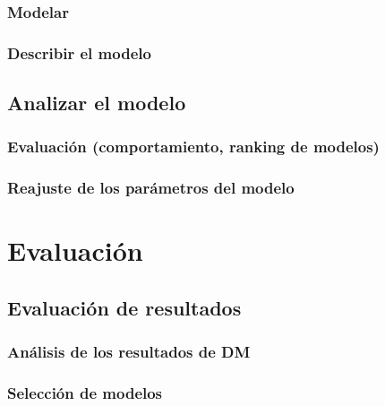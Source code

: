 \documentclass[11pt,a4paper,twoside]{tesis}
\begin{document}
\subsection{Modelar}
\subsection{Describir el modelo}
\section{Analizar el modelo}
\subsection{Evaluación (comportamiento, ranking de modelos)}
\subsection{Reajuste de los parámetros del modelo}

\chapter{Evaluación}
\section{Evaluación de resultados}
\subsection{Análisis de los resultados de DM}
\subsection{Selección de modelos}
\end{document}
